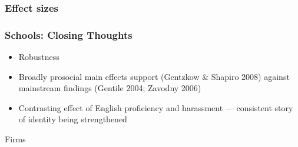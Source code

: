 \documentclass{beamer}
\begin{document}
\begin{frame}
\frametitle{Effect sizes}

\begin{center}
\end{center}


\end{frame}

\begin{frame}
\frametitle{Schools: Closing Thoughts}
\label{schl_close}
\begin{itemize}
\item  Robustness \hyperlink{schl_robust}{}  \hyperlink{schl_spatial}{}
\item Broadly prosocial main effects support {\footnotesize(Gentzkow \& Shapiro 2008)} against mainstream findings {\footnotesize (Gentile 2004; Zavodny 2006)}
\item Contrasting effect of English proficiency and harassment --- consistent story of identity being strengthened
\end{itemize}
\end{frame}



\begin{frame}

\huge {\color{darkblue} Firms}

\end{frame}
\end{document}
